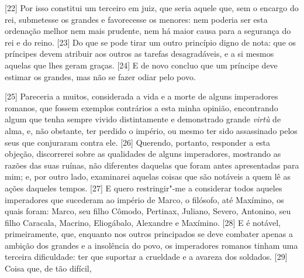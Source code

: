 {[}22{]} Por isso constitui um
terceiro em juiz, que seria aquele que, sem o encargo do rei, submetesse
os grandes e favorecesse os menores: nem poderia ser esta ordenação
melhor nem mais prudente, nem há maior causa para a segurança do rei e
do reino. {[}23{]} Do que se pode tirar um outro princípio digno de
nota: que os príncipes devem atribuir aos outros as tarefas
desagradáveis, e a si mesmos aquelas que lhes geram graças. {[}24{]} E
de novo concluo que um príncipe deve estimar os grandes, mas não se
fazer odiar pelo povo.

{[}25{]} Pareceria a muitos, considerada a vida e a morte de alguns
imperadores romanos, que fossem exemplos contrários a esta minha
opinião, encontrando algum que tenha sempre vivido distintamente e
demonstrado grande \emph{virtù} de alma, e, não obstante, ter perdido o
império, ou mesmo ter sido assassinado pelos seus que conjuraram contra
ele. {[}26{]} Querendo, portanto, responder a esta objeção, discorrerei
sobre as qualidades de alguns imperadores, mostrando as razões das suas
ruínas, não diferentes daquelas que foram antes apresentadas para mim;
e, por outro lado, examinarei aquelas coisas que são notáveis a quem lê
as ações daqueles tempos. {[}27{]} E quero restringir"-me a considerar
todos aqueles imperadores que sucederam ao império de Marco, o filósofo,
até Maxímino, os quais foram: Marco, seu filho Cômodo, Pertinax,
Juliano, Severo, Antonino, seu filho Caracala, Macrino, Eliogábalo,
Alexandre e Maxímino. {[}28{]} E é notável, primeiramente, que, enquanto nos outros
principados se deve combater apenas a ambição dos grandes e a insolência
do povo, os imperadores romanos tinham uma terceira dificuldade: ter que
suportar a crueldade e a avareza dos soldados. {[}29{]} Coisa que, de tão difícil,
